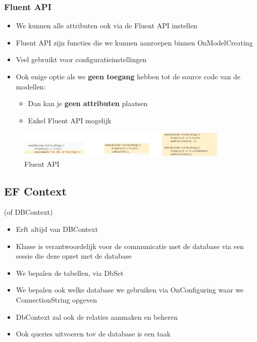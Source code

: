 \documentclass{article}
\begin{document}
\subsubsection{Fluent API}

\begin{itemize}
    \item We kunnen alle attributen ook via de Fluent API instellen
    \item Fluent API zijn functies die we kunnen aanroepen binnen OnModelCreating   
    \item Veel gebruikt voor configuratieinstellingen
    \item Ook enige optie als we \textbf{geen toegang} hebben tot de source code van de modellen:
    \begin{itemize}
        \item Dan kan je \textbf{geen attributen} plaatsen
        \item Enkel Fluent API mogelijk
    \end{itemize}
\end{itemize}

\begin{figure}[H]
    \centering
    \includegraphics[width=0.9\textwidth]{efcore-fluentapi.png}
    \caption{Fluent API}
\end{figure}

\subsection{EF Context}

(of DBContext)

\begin{itemize}
    \item Erft altijd van DBContext
    \item Klasse is verantwoordelijk voor de communicatie met de database via een sessie die deze opzet met de database
    \item We bepalen de tabellen, via DbSet
    \item We bepalen ook welke database we gebruiken via OnConfiguring waar we ConnectionString opgeven
    \item DbContext zal ook de relaties aanmaken en beheren
    \item Ook queries uitvoeren tov de database is een taak
\end{itemize}
\end{document}
